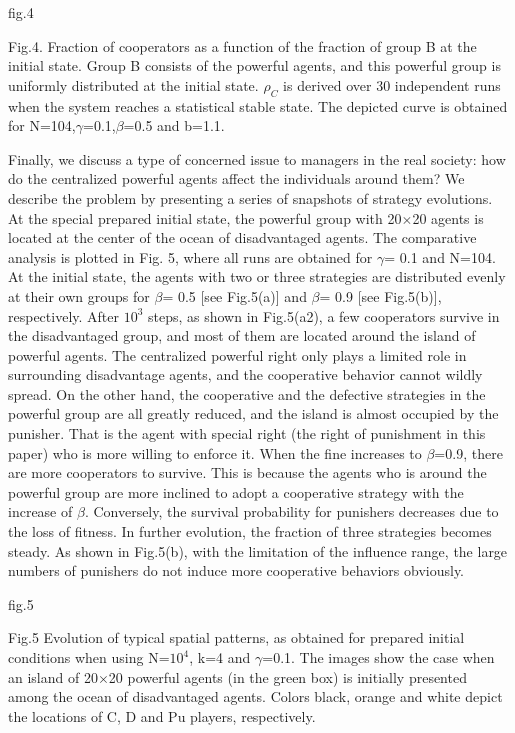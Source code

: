 \documentclass[%
 aip,
 amsmath,amssymb,
 reprint,%
]{revtex4-1}
\begin{document}
fig.4

Fig.4. Fraction of cooperators as a function of the fraction of group B at the initial state. Group B consists of the powerful agents, and this powerful group is uniformly distributed at the initial state. $\rho_{C}$ is derived over 30 independent runs when the system reaches a statistical stable state. The depicted curve is obtained for N=104,$\gamma$=0.1,$\beta$=0.5 and b=1.1.

Finally, we discuss a type of concerned issue to managers in the real society: how do the centralized powerful agents affect the individuals around them? We describe the problem by presenting a series of snapshots of strategy evolutions. At the special prepared initial state, the powerful group with 20$\times$20 agents is located at the center of the ocean of disadvantaged agents. The comparative analysis is plotted in Fig. 5, where all runs are obtained for $\gamma$= 0.1 and N=104. At the initial state, the agents with two or three strategies are distributed evenly at their own groups for $\beta$= 0.5 [see Fig.5(a)] and $\beta$= 0.9 [see Fig.5(b)], respectively. After $10^{3}$ steps, as shown in Fig.5(a2), a few cooperators survive in the disadvantaged group, and most of them are located around the island of powerful agents. The centralized powerful right only plays a limited role in surrounding disadvantage agents, and the cooperative behavior cannot wildly spread. On the other hand, the cooperative and the defective strategies in the powerful group are all greatly reduced, and the island is almost occupied by the punisher. That is the agent with special right (the right of punishment in this paper) who is more willing to enforce it. When the fine increases to $\beta$=0.9, there are more cooperators to survive. This is because the agents who is around the powerful group are more inclined to adopt a cooperative strategy with the increase of $\beta$. Conversely, the survival probability for punishers decreases due to the loss of fitness. In further evolution, the fraction of three strategies becomes steady. As shown in Fig.5(b), with the limitation of the influence range, the large numbers of punishers do not induce more cooperative behaviors obviously.

fig.5

Fig.5 Evolution of typical spatial patterns, as obtained for prepared initial conditions when using N=$10^{4}$, k=4 and $\gamma$=0.1. The images show the case when an island of 20$\times$20 powerful agents (in the green box) is initially presented among the ocean of disadvantaged agents. Colors black, orange and white depict the locations of C, D and Pu players, respectively.
\end{document}
